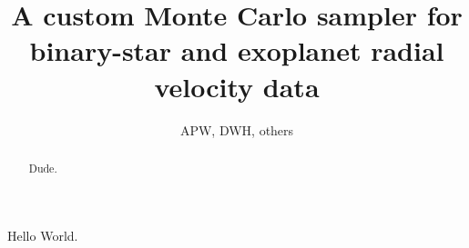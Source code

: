 \documentclass[12pt, preprint]{aastex}
\begin{document}
\title{A custom Monte Carlo sampler for binary-star and exoplanet radial velocity data}
\author{APW, DWH, others}

\begin{abstract}
Dude.
\end{abstract}


Hello World.
\end{document}
